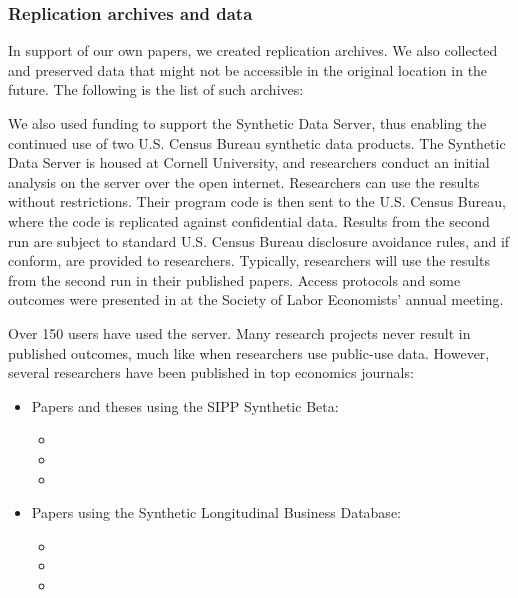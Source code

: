 \documentclass[12pt]{article}
\begin{document}
\subsubsection*{Replication archives and data}
In support of our own papers, we created replication archives. We also collected and preserved data that might not be accessible in the original location in the future. The following is the list of such archives:


\printbibliography[filter=reparchive,heading=none]

We also used funding to support the Synthetic Data Server, thus enabling the continued use of two U.S. Census Bureau synthetic data products. The Synthetic Data Server is housed at Cornell University, and researchers conduct an initial analysis on the server over the open internet. Researchers can use the results without restrictions. Their program code is then sent to the U.S. Census Bureau, where the code is replicated against confidential data. Results from the second run are subject to standard U.S. Census Bureau disclosure avoidance rules, and if conform, are provided to researchers. Typically, researchers will use the results from the second run in their published papers. Access protocols and some outcomes were presented in \textcite{Improved-Access-Abowd-SOLE-20130503} at the Society of Labor Economists' annual meeting.

Over 150 users have used the server. Many research projects never result in published outcomes, much like when researchers use public-use data. However, several researchers have been published in top economics journals: 
\begin{itemize}
	\item Papers and theses using the SIPP Synthetic Beta:
	\begin{itemize}
		\item {}
		\item {}
		\item {}
	\end{itemize}
    \item Papers using the Synthetic Longitudinal Business Database:
    \begin{itemize}
    	\item {}
    	\item {}
    	\item {}
    \end{itemize}
\end{itemize}
\end{document}
